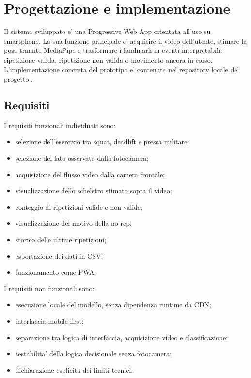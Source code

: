 
\chapter{Progettazione e implementazione}
\label{ch:proposal}

Il sistema sviluppato e' una Progressive Web App orientata all'uso su smartphone. La sua funzione principale e' acquisire il video dell'utente, stimare la posa tramite MediaPipe e trasformare i landmark in eventi interpretabili: ripetizione valida, ripetizione non valida o movimento ancora in corso. L'implementazione concreta del prototipo e' contenuta nel repository locale del progetto \cite{projectRepository2026}.

\section{Requisiti}

I requisiti funzionali individuati sono:

\begin{itemize}
  \item selezione dell'esercizio tra squat, deadlift e pressa militare;
  \item selezione del lato osservato dalla fotocamera;
  \item acquisizione del flusso video dalla camera frontale;
  \item visualizzazione dello scheletro stimato sopra il video;
  \item conteggio di ripetizioni valide e non valide;
  \item visualizzazione del motivo della no-rep;
  \item storico delle ultime ripetizioni;
  \item esportazione dei dati in CSV;
  \item funzionamento come PWA.
\end{itemize}

I requisiti non funzionali sono:

\begin{itemize}
  \item esecuzione locale del modello, senza dipendenza runtime da CDN;
  \item interfaccia mobile-first;
  \item separazione tra logica di interfaccia, acquisizione video e classificazione;
  \item testabilita' della logica decisionale senza fotocamera;
  \item dichiarazione esplicita dei limiti tecnici.
\end{itemize}

